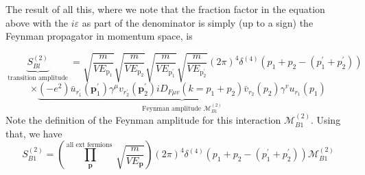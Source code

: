 The result of all this, where we note that the fraction factor in the equation above with the $i\varepsilon$ as part of the denominator is simply (up to a sign) the Feynman propagator in momentum space, is
\begin{qt}
    $$
\underbrace{S_{B l}^{(2)}}_{\text { transition amplitude }}=\sqrt{\frac{m}{V E_{\mathrm{p}_1}}} \sqrt{\frac{m}{V E_{\mathrm{p}_2}}} \sqrt{\frac{m}{V E_{\mathrm{p}_1^{\prime}}}} \sqrt{\frac{m}{V E_{\mathrm{p}^{\prime}_{2}}}}(2 \pi)^{4} \delta^{(4)}\left(p_{1}+p_{2}-\left(p_{1}^{\prime}+p_{2}^{\prime}\right)\right)
$$
$$
\times \underbrace{\left(-e^{2}\right) \bar{u}_{r_{1}^{\prime}}\left(\mathbf{p}_{1}^{\prime}\right) \gamma^{\mu} v_{r_{2}^{\prime}}\left(\mathbf{p}_{2}^{\prime}\right) i D_{F \mu v}\left(k=p_{1}+p_{2}\right) \bar{v}_{r_{2}}\left(p_{2}\right) \gamma^{v} u_{r_{1}}\left(p_{1}\right)}_{\text {Feynman amplitude } \mathcal{M}_{B 1}^{(2)}}
$$
Note the definition of the Feynman amplitude for this interaction $\mathcal{M}_{B 1}^{(2)}$. Using that, we have
\begin{equation}
S_{B 1}^{(2)}=\left(\prod_{\mathbf{p}}^{\text {all ext fermions }} \sqrt{\frac{m}{V E_{\mathbf{p}}}}\right)(2 \pi)^{4} \delta^{(4)}\left(p_{1}+p_{2}-\left(p_{1}^{\prime}+p_{2}^{\prime}\right)\right) \mathcal{M}_{B 1}^{(2)}
\end{equation}
\end{qt}
